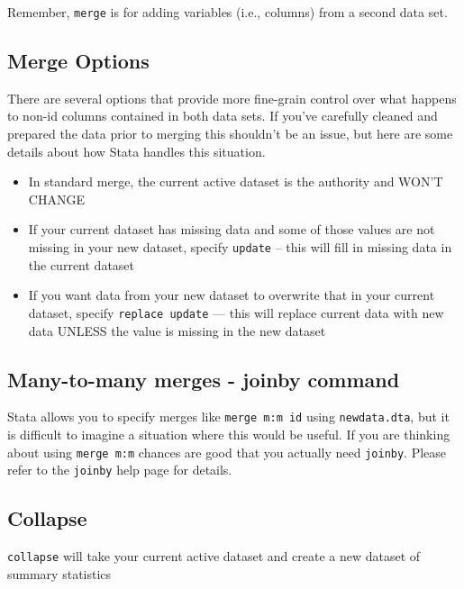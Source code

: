 \documentclass[
]{book}
\providecommand{\tightlist}{%
  \setlength{\itemsep}{0pt}\setlength{\parskip}{0pt}}
\begin{document}
Remember, \texttt{merge} is for adding variables (i.e., columns) from a second data set.

\hypertarget{merge-options}{%
\subsection{Merge Options}\label{merge-options}}

There are several options that provide more fine-grain control over what happens to non-id columns contained in both data sets. If you've carefully cleaned and prepared the data prior to merging this shouldn't be an issue, but here are some details about how Stata handles this situation.

\begin{itemize}
\tightlist
\item
  In standard merge, the current active dataset is the authority and WON'T CHANGE
\item
  If your current dataset has missing data and some of those values are not missing in your new dataset, specify \texttt{update} -- this will fill in missing data in the current dataset
\item
  If you want data from your new dataset to overwrite that in your current dataset, specify \texttt{replace\ update} --- this will replace current data with new data UNLESS the value is missing in the new dataset
\end{itemize}

\hypertarget{many-to-many-merges---joinby-command}{%
\subsection{Many-to-many merges - joinby command}\label{many-to-many-merges---joinby-command}}

Stata allows you to specify merges like \texttt{merge\ m:m\ id} using \texttt{newdata.dta}, but it is difficult to imagine a situation where this would be useful. If you are thinking about using \texttt{merge\ m:m} chances are good that you actually need \texttt{joinby}. Please refer to the \texttt{joinby} help page for details.

\hypertarget{collapse}{%
\subsection{Collapse}\label{collapse}}

\texttt{collapse} will take your current active dataset and create a new dataset of summary statistics
\end{document}
